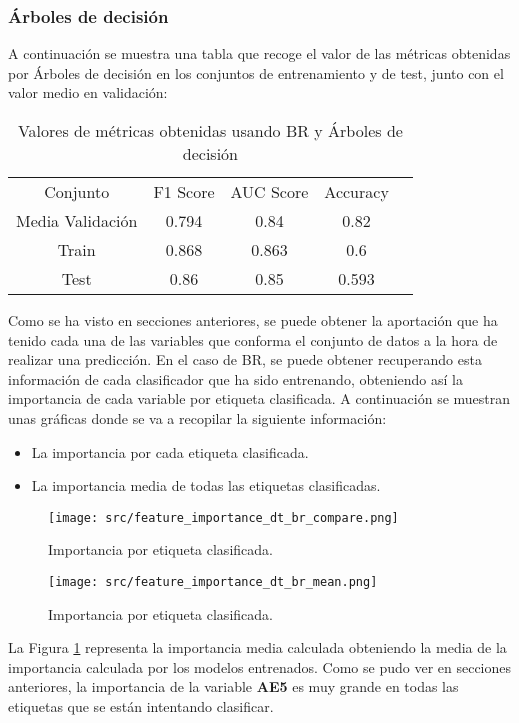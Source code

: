 \subsubsection*{Árboles de decisión}
A continuación se muestra una tabla que recoge el valor de las métricas obtenidas por Árboles de decisión en los conjuntos de entrenamiento y de test, junto con el valor medio en validación:
\begin{table}[H]
	\centering
	\begin{tabular}{|c|c|c|c|c}
		\cline{1-4}
		Conjunto         & F1 Score & AUC Score & Accuracy \\ \cline{1-4}
		Media Validación & 0.794    & 0.84      & 0.82     \\ \cline{1-4}
		Train            & 0.868    & 0.863     & 0.6      \\ \cline{1-4}
		Test             & 0.86     & 0.85      & 0.593    \\ \cline{1-4}
	\end{tabular}
	\caption{Valores de métricas obtenidas usando BR y Árboles de decisión}
\end{table}
Como se ha visto en secciones anteriores, se puede obtener la aportación que ha tenido cada una de las variables que conforma el conjunto de datos a la hora de realizar una predicción. En el caso de BR, se puede obtener recuperando esta información de cada clasificador que ha sido entrenando, obteniendo así la importancia de cada variable por etiqueta clasificada.
A continuación se muestran unas gráficas donde se va a recopilar la siguiente información:
\begin{itemize}
	\item La importancia por cada etiqueta clasificada.
	\item La importancia media de todas las etiquetas clasificadas.
\end{itemize}
\begin{figure}[H]
	\centering
	\texttt{[image: src/feature\_importance\_dt\_br\_compare.png]}
	\caption{Importancia por etiqueta clasificada.}
	\label{fig:dt_br_label}
\end{figure}
\begin{figure}[H]
	\centering
	\texttt{[image: src/feature\_importance\_dt\_br\_mean.png]}
	\caption{Importancia por etiqueta clasificada.}
	\label{fig:dt_br_mean}
\end{figure}
La Figura \ref{fig:dt_br_label} representa la importancia media calculada obteniendo la media de la importancia calculada por los modelos entrenados. Como se pudo ver en secciones anteriores, la importancia de la variable \textbf{AE5} es muy grande en todas las etiquetas que se están intentando clasificar.\\
